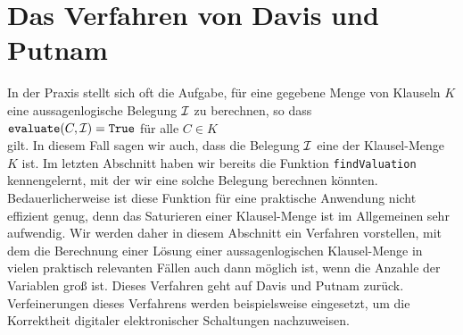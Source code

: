 
\section{Das Verfahren von Davis und Putnam}
In der Praxis stellt sich oft die Aufgabe, für eine gegebene Menge von Klauseln $K$ eine aussagenlogische
Belegung $\mathcal{I}$ zu berechnen, so dass 
\\[0.2cm]
\hspace*{1.3cm} $\texttt{evaluate}(C,\mathcal{I}) = \texttt{True}$ \quad für alle $C\in K$ \\[0.2cm]
gilt.  In diesem Fall sagen wir auch, dass die Belegung $\mathcal{I}$ eine  der
Klausel-Menge $K$ ist.  Im letz\-ten Abschnitt haben wir bereits die Funktion \texttt{findValuation}
kennengelernt, mit der wir eine solche Belegung berechnen könnten.
Bedauerlicherweise ist diese Funktion für eine praktische Anwendung nicht effizient genug, denn das Saturieren
einer Klausel-Menge ist im Allgemeinen sehr aufwendig.
Wir werden daher in diesem Abschnitt ein Verfahren vorstellen, mit dem die Berechnung einer Lösung
einer aussagenlogischen Klausel-Menge in vielen praktisch relevanten Fällen auch dann möglich ist, wenn die
Anzahle der Variablen groß ist.  Dieses Verfahren geht auf Davis und Putnam
\cite{davis:1960, davis:1962} zurück.  Verfeinerungen dieses Verfahrens werden beispielsweise
eingesetzt, um die Korrektheit digitaler elektronischer Schaltungen nachzuweisen.  

